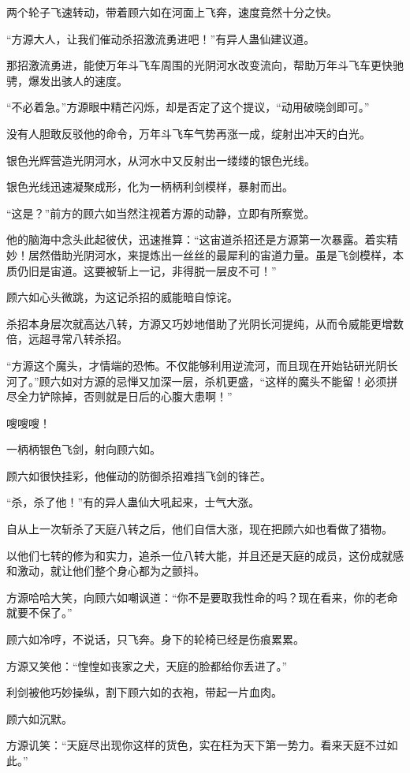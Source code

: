 \begin{this_body}
两个轮子飞速转动，带着顾六如在河面上飞奔，速度竟然十分之快。

“方源大人，让我们催动杀招激流勇进吧！”有异人蛊仙建议道。

那招激流勇进，能使万年斗飞车周围的光阴河水改变流向，帮助万年斗飞车更快驰骋，爆发出骇人的速度。

“不必着急。”方源眼中精芒闪烁，却是否定了这个提议，“动用破晓剑即可。”

没有人胆敢反驳他的命令，万年斗飞车气势再涨一成，绽射出冲天的白光。

银色光辉营造光阴河水，从河水中又反射出一缕缕的银色光线。

银色光线迅速凝聚成形，化为一柄柄利剑模样，暴射而出。

“这是？”前方的顾六如当然注视着方源的动静，立即有所察觉。

他的脑海中念头此起彼伏，迅速推算：“这宙道杀招还是方源第一次暴露。着实精妙！居然借助光阴河水，来提炼出一丝丝的最犀利的宙道力量。虽是飞剑模样，本质仍旧是宙道。这要被斩上一记，非得脱一层皮不可！”

顾六如心头微跳，为这记杀招的威能暗自惊诧。

杀招本身层次就高达八转，方源又巧妙地借助了光阴长河提纯，从而令威能更增数倍，远超寻常八转杀招。

“方源这个魔头，才情端的恐怖。不仅能够利用逆流河，而且现在开始钻研光阴长河了。”顾六如对方源的忌惮又加深一层，杀机更盛，“这样的魔头不能留！必须拼尽全力铲除掉，否则就是日后的心腹大患啊！”

嗖嗖嗖！

一柄柄银色飞剑，射向顾六如。

顾六如很快挂彩，他催动的防御杀招难挡飞剑的锋芒。

“杀，杀了他！”有的异人蛊仙大吼起来，士气大涨。

自从上一次斩杀了天庭八转之后，他们自信大涨，现在把顾六如也看做了猎物。

以他们七转的修为和实力，追杀一位八转大能，并且还是天庭的成员，这份成就感和激动，就让他们整个身心都为之颤抖。

方源哈哈大笑，向顾六如嘲讽道：“你不是要取我性命的吗？现在看来，你的老命就要不保了。”

顾六如冷哼，不说话，只飞奔。身下的轮椅已经是伤痕累累。

方源又笑他：“惶惶如丧家之犬，天庭的脸都给你丢进了。”

利剑被他巧妙操纵，割下顾六如的衣袍，带起一片血肉。

顾六如沉默。

方源讥笑：“天庭尽出现你这样的货色，实在枉为天下第一势力。看来天庭不过如此。”


\end{this_body}
